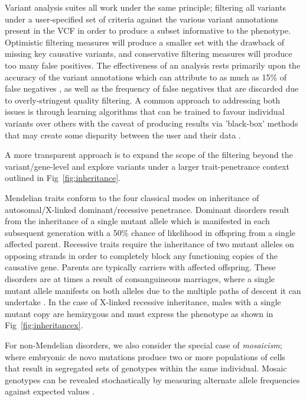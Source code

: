 \documentclass{bioinfo}
\begin{document}
Variant analysis suites all work under the same principle; filtering all variants under a user-specified set of criteria against the various variant annotations present in the VCF in order to produce a subset informative to the phenotype. Optimistic filtering measures will produce a smaller set with the drawback of missing key causative variants, and conservative filtering measures will produce too many false positives. The effectiveness of an analysis rests primarily upon the accuracy of the variant annotations which can attribute to as much as 15\% of false negatives \citep{warden2014detailed}, as well as the frequency of false negatives that are discarded due to overly-stringent quality filtering. A common approach to addressing both issues is through learning algorithms that can be trained to favour individual variants over others with the caveat of producing results via 'black-box' methods that may create some disparity between the user and their data \citep{pabinger2014survey}. 

A more transparent approach is to expand the scope of the filtering beyond the variant/gene-level and explore variants under a larger trait-penetrance context outlined in Fig~\ref{fig:inheritance}.

Mendelian traits conform to the four classical modes on inheritance of autosomal/X-linked dominant/recessive penetrance. Dominant disorders result from the inheritance of a single mutant allele which is manifested in each subsequent generation with a 50\% chance of likelihood in offspring from a single affected parent. Recessive traits require the inheritance of two mutant alleles on opposing strands in order to completely block any functioning copies of the causative gene. Parents are typically carriers with affected offspring. These disorders are at times a result of consanguineous marriages, where a single mutant allele manifests on both alleles due to the multiple paths of descent it can undertake \citep{kari2014consanguinity}. In the case of X-linked recessive inheritance, males with a single mutant copy are hemizygous and must express the phenotype as shown in Fig~\ref{fig:inheritancex}.

For non-Mendelian disorders, we also consider the special case of \textit{mosaicism}; where embryonic de novo mutations produce two or more populations of cells that result in segregated sets of genotypes within the same individual. Mosaic genotypes can be revealed stochastically by measuring alternate allele frequencies against expected values \citep{biesecker2013genomic}.
\end{document}
